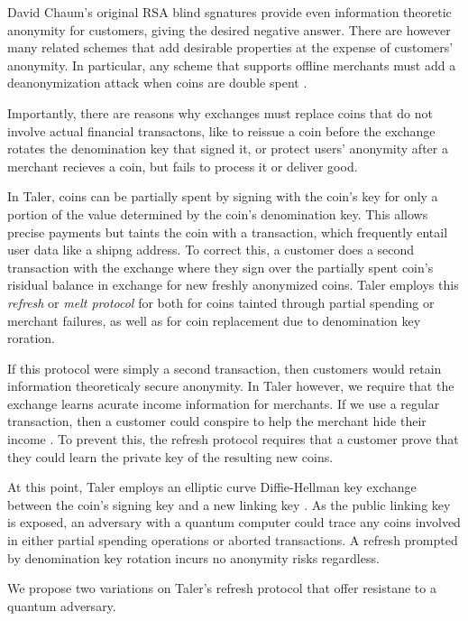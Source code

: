\documentclass{llncs}
\begin{document}
David Chaum's original RSA blind sgnatures provide even information
theoretic anonymity for customers, giving the desired negative answer.
There are however many related schemes that add desirable properties
at the expense of customers' anonymity.  In particular, any scheme
that supports offline merchants must add a deanonymization attack
when coins are double spent \cite{B??}.  

Importantly, there are reasons why exchanges must replace coins that
do not involve actual financial transactons, like to reissue a coin
before the exchange rotates the denomination key that signed it, or
protect users' anonymity after a merchant recieves a coin, but fails
to process it or deliver good.

In Taler, coins can be partially spent by signing with the coin's key
for only a portion of the value determined by the coin's denomination
key.  This allows precise payments but taints the coin with a
transaction,  which frequently entail user data like a shipng address.  
To correct this, a customer does a second transaction with the exchange
where they sign over the partially spent coin's risidual balance
in exchange for new freshly anonymized coins.  
Taler employs this {\em refresh} or {\em melt protocol} for
both for coins tainted through partial spending or merchant failures,
as well as for coin replacement due to denomination key roration.

If this protocol were simply a second transaction, then customers
would retain information theoreticaly secure anonymity.  
In Taler however, we require that the exchange learns acurate income
information for merchants.  If we use a regular transaction, then
a customer could conspire to help the merchant hide their income
\cite[]{Taler??}.
To prevent this, the refresh protocol requires that a customer prove
that they could learn the private key of the resulting new coins.

At this point, Taler employs an elliptic curve Diffie-Hellman key
exchange between the coin's signing key and a new linking key 
\cite[??]{Taler??}.  As the public linking key is exposed,
an adversary with a quantum computer could trace any coins involved
in either partial spending operations or aborted transactions.
A refresh prompted by denomination key rotation incurs no anonymity
risks regardless.

\smallskip

We propose two variations on Taler's refresh protocol that offer
resistane to a quantum adversary.
\end{document}
